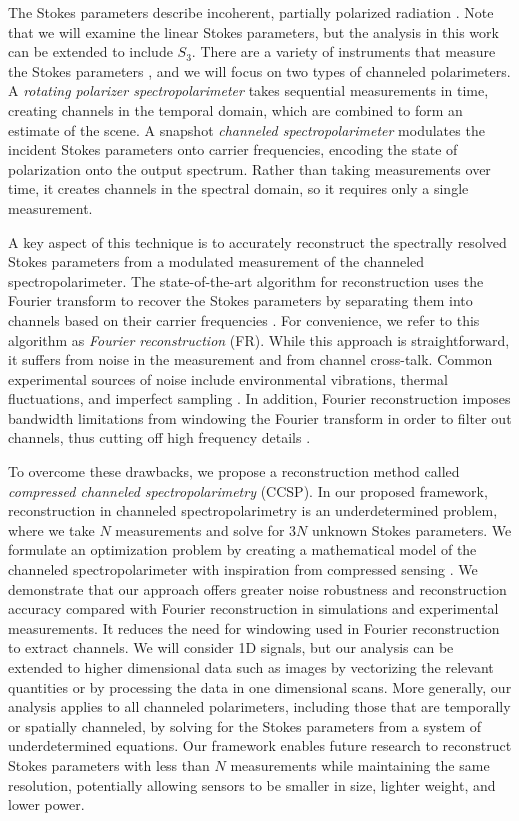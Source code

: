 \documentclass[10pt]{article}
\numberwithin{equation}{subsection}
\begin{document}
The Stokes parameters describe incoherent, partially polarized radiation \cite{Chipman95}.
Note that we will examine the linear Stokes parameters, but the analysis in this work can be extended to include $S_3$.
There are a variety of instruments that measure the Stokes parameters \cite{Tyo06}, and we will focus on two types of channeled polarimeters.
A \emph{rotating polarizer spectropolarimeter} takes sequential measurements in time, creating channels in the temporal domain, which are combined to form an estimate of the scene.
A snapshot \emph{channeled spectropolarimeter} modulates the incident Stokes parameters onto carrier frequencies, encoding the state of polarization onto the output spectrum.
Rather than taking measurements over time, it creates channels in the spectral domain, so it requires only a single measurement.

A key aspect of this technique is to accurately reconstruct the spectrally resolved Stokes parameters from a modulated measurement of the channeled spectropolarimeter.
The state-of-the-art algorithm for reconstruction uses the Fourier transform to recover the Stokes parameters by separating them into channels based on their carrier frequencies \cite{Kudenov07}.
For convenience, we refer to this algorithm as \emph{Fourier reconstruction} (FR).
While this approach is straightforward, it suffers from noise in the measurement and from channel cross-talk.
Common experimental sources of noise include environmental vibrations, thermal fluctuations, and imperfect sampling \cite{Lee14, Lee15}.
In addition, Fourier reconstruction imposes bandwidth limitations from windowing the Fourier transform in order to filter out channels, thus cutting off high frequency details \cite{LaCasse11}.

To overcome these drawbacks, we propose a reconstruction method called \emph{compressed channeled spectropolarimetry} (CCSP).
    In our proposed framework, reconstruction in channeled spectropolarimetry is an underdetermined problem, where we take $N$ measurements and solve for $3 N$ unknown Stokes parameters.
    We formulate an optimization problem by creating a mathematical model of the channeled spectropolarimeter with inspiration from compressed sensing \cite{Donoho06, LeeSPIE16, LeeArxiv16}.
    We demonstrate that our approach offers greater noise robustness and reconstruction accuracy compared with Fourier reconstruction in simulations and experimental measurements.
    It reduces the need for windowing used in Fourier reconstruction to extract channels.
    We will consider 1D signals, but our analysis can be extended to higher dimensional data such as images by vectorizing the relevant quantities or by processing the data in one dimensional scans.
    More generally, our analysis applies to all channeled polarimeters, including those that are temporally or spatially channeled, by solving for the Stokes parameters from a system of underdetermined equations.
    Our framework enables future research to reconstruct Stokes parameters with less than $N$ measurements while maintaining the same resolution, potentially allowing sensors to be smaller in size, lighter weight, and lower power.
\end{document}
